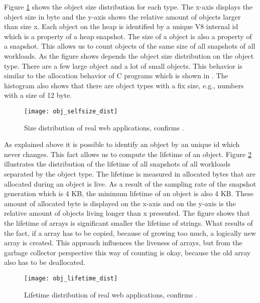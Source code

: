 Figure \ref{fig:obj_selfsize_dist} shows the object size distribution for each type. The x-axis displays the object size in byte and the y-axis shows the relative amount of objects larger than size x. Each object on the \JS heap is identified by a unique V8 internal id which is a property of a heap snapshot. The size of a object is also a property of a snapshot. This allows us to count objects of the same size of all snapshots of all workloads. As the figure shows depends the object size distribution on the object type. There are a few large object and a lot of small objects. This behavior is similar to the allocation behavior of C programs which is shown in \cite{Aigner2013}. The histogram also shows that there are object types with a fix size, e.g., numbers with a size of 12 byte.
\begin{figure}
	\centering
	\texttt{[image: obj\_selfsize\_dist]}
	\caption{Size distribution of real web applications, confirms \cite{JSMeter2009}.}
	\label{fig:obj_selfsize_dist}
\end{figure}

As explained above it is possible to identify an object by an unique id which never changes. This fact allows us to compute the lifetime of an object. Figure \ref{fig:obj_lifetime_dist} illustrates the distribution of the lifetime of all snapshots of all workloads separated by the object type. The lifetime is measured in allocated bytes that are allocated during an object is live. As a result of the sampling rate of the snapshot generation which is 4 KB, the minimum lifetime of an object is also 4 KB. These amount of allocated byte is displayed on the x-axis and on the y-axis is the relative amount of objects living longer than x presented. The figure shows that the lifetime of arrays is significant smaller the lifetime of strings. What results of the fact, if a array has to be copied, because of growing too much, a logically new array is created. This approach influences the liveness of arrays, but from the garbage collector perspective this way of counting is okay, because the old array also has to be deallocated.
\begin{figure}
	\centering
	\texttt{[image: obj\_lifetime\_dist]}
	\caption{Lifetime distribution of real web applications, confirms \cite{JSMeter2009}.}
	\label{fig:obj_lifetime_dist}
\end{figure}

